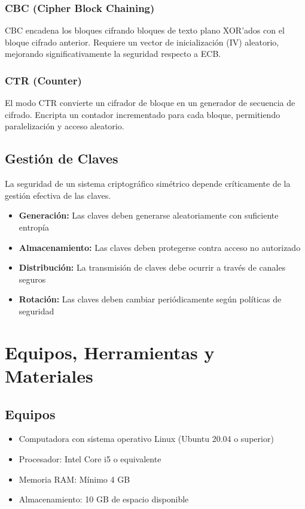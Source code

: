 \documentclass[11pt,a4paper]{article}
\begin{document}
\subsubsection{CBC (Cipher Block Chaining)}

CBC encadena los bloques cifrando bloques de texto plano XOR'ados con el bloque cifrado anterior. Requiere un vector de inicialización (IV) aleatorio, mejorando significativamente la seguridad respecto a ECB.

\subsubsection{CTR (Counter)}

El modo CTR convierte un cifrador de bloque en un generador de secuencia de cifrado. Encripta un contador incrementado para cada bloque, permitiendo paralelización y acceso aleatorio.

\subsection{Gestión de Claves}

La seguridad de un sistema criptográfico simétrico depende críticamente de la gestión efectiva de las claves.

\begin{itemize}
    \item \textbf{Generación:} Las claves deben generarse aleatoriamente con suficiente entropía
    \item \textbf{Almacenamiento:} Las claves deben protegerse contra acceso no autorizado
    \item \textbf{Distribución:} La transmisión de claves debe ocurrir a través de canales seguros
    \item \textbf{Rotación:} Las claves deben cambiar periódicamente según políticas de seguridad
\end{itemize}

\section{Equipos, Herramientas y Materiales}

\subsection{Equipos}
\begin{itemize}
    \item Computadora con sistema operativo Linux (Ubuntu 20.04 o superior)
    \item Procesador: Intel Core i5 o equivalente
    \item Memoria RAM: Mínimo 4 GB
    \item Almacenamiento: 10 GB de espacio disponible
\end{itemize}
\end{document}
